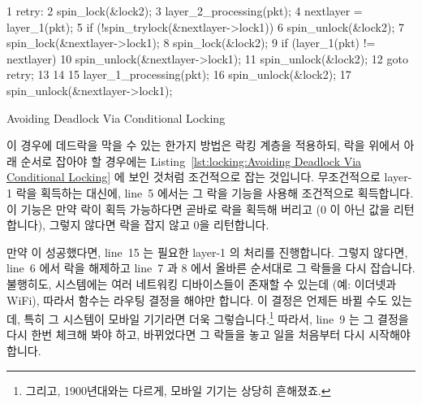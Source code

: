 \begin{listing}[tbp]
{ \scriptsize
\begin{verbbox}
  1 retry:
  2   spin_lock(&lock2);
  3   layer_2_processing(pkt);
  4   nextlayer = layer_1(pkt);
  5   if (!spin_trylock(&nextlayer->lock1)) {
  6     spin_unlock(&lock2);
  7     spin_lock(&nextlayer->lock1);
  8     spin_lock(&lock2);
  9     if (layer_1(pkt) != nextlayer) {
 10       spin_unlock(&nextlayer->lock1);
 11       spin_unlock(&lock2);
 12       goto retry;
 13     }
 14   }
 15   layer_1_processing(pkt);
 16 spin_unlock(&lock2);
 17 spin_unlock(&nextlayer->lock1);
\end{verbbox}
}
\centering
\theverbbox
\caption{Avoiding Deadlock Via Conditional Locking}
\label{lst:locking:Avoiding Deadlock Via Conditional Locking}
\end{listing}

이 경우에 데드락을 막을 수 있는 한가지 방법은 락킹 계층을 적용하되, 락을 위에서
아래 순서로 잡아야 할 경우에는 
Listing~\ref{lst:locking:Avoiding Deadlock Via Conditional Locking} 에 보인
것처럼 조건적으로 잡는 것입니다.
무조건적으로 layer-1 락을 획득하는 대신에, line~5 에서는 그 락을
 기능을 사용해 조건적으로 획득합니다.
이 기능은 만약 락이 획득 가능하다면 곧바로 락을 획득해 버리고 (0 이 아닌 값을
리턴합니다), 그렇지 않다면 락을 잡지 않고 0을 리턴합니다.

만약  이 성공했다면, line~15 는 필요한 layer-1 의 처리를
진행합니다.
그렇지 않다면, line~6 에서 락을 해제하고 line~7 과 8 에서 올바른 순서대로 그
락들을 다시 잡습니다.
불행히도, 시스템에는 여러 네트워킹 디바이스들이 존재할 수 있는데 (예: 이더넷과
WiFi), 따라서  함수는 라우팅 결정을 해야만 합니다.
이 결정은 언제든 바뀔 수도 있는데, 특히 그 시스템이 모바일 기기라면 더욱
그렇습니다.\footnote{
	그리고, 1900년대와는 다르게, 모바일 기기는 상당히 흔해졌죠.}
따라서, line~9 는 그 결정을 다시 한번 체크해 봐야 하고, 바뀌었다면 그 락들을
놓고 일을 처음부터 다시 시작해야 합니다.
\iffalse

